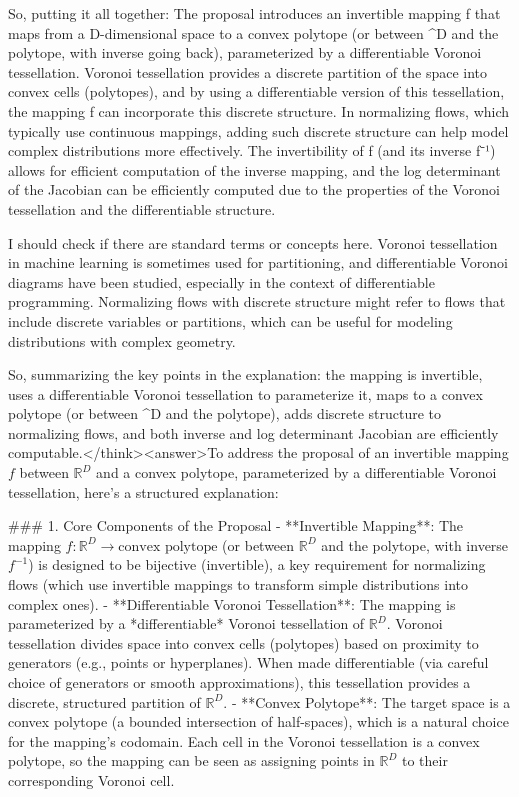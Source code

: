 So, putting it all together: The proposal introduces an invertible mapping f that maps from a D-dimensional space to a convex polytope (or between ^D and the polytope, with inverse going back), parameterized by a differentiable Voronoi tessellation. Voronoi tessellation provides a discrete partition of the space into convex cells (polytopes), and by using a differentiable version of this tessellation, the mapping f can incorporate this discrete structure. In normalizing flows, which typically use continuous mappings, adding such discrete structure can help model complex distributions more effectively. The invertibility of f (and its inverse f⁻¹) allows for efficient computation of the inverse mapping, and the log determinant of the Jacobian can be efficiently computed due to the properties of the Voronoi tessellation and the differentiable structure. 

I should check if there are standard terms or concepts here. Voronoi tessellation in machine learning is sometimes used for partitioning, and differentiable Voronoi diagrams have been studied, especially in the context of differentiable programming. Normalizing flows with discrete structure might refer to flows that include discrete variables or partitions, which can be useful for modeling distributions with complex geometry. 

So, summarizing the key points in the explanation: the mapping is invertible, uses a differentiable Voronoi tessellation to parameterize it, maps to a convex polytope (or between ^D and the polytope), adds discrete structure to normalizing flows, and both inverse and log determinant Jacobian are efficiently computable.</think><answer>To address the proposal of an invertible mapping \( f \) between \( \mathbb{R}^D \) and a convex polytope, parameterized by a differentiable Voronoi tessellation, here’s a structured explanation:  


### 1. Core Components of the Proposal  
- **Invertible Mapping**: The mapping \( f: \mathbb{R}^D \to \text{convex polytope} \) (or between \( \mathbb{R}^D \) and the polytope, with inverse \( f^{-1} \)) is designed to be bijective (invertible), a key requirement for normalizing flows (which use invertible mappings to transform simple distributions into complex ones).  
- **Differentiable Voronoi Tessellation**: The mapping is parameterized by a *differentiable* Voronoi tessellation of \( \mathbb{R}^D \). Voronoi tessellation divides space into convex cells (polytopes) based on proximity to generators (e.g., points or hyperplanes). When made differentiable (via careful choice of generators or smooth approximations), this tessellation provides a discrete, structured partition of \( \mathbb{R}^D \).  
- **Convex Polytope**: The target space is a convex polytope (a bounded intersection of half-spaces), which is a natural choice for the mapping’s codomain. Each cell in the Voronoi tessellation is a convex polytope, so the mapping can be seen as assigning points in \( \mathbb{R}^D \) to their corresponding Voronoi cell.  


